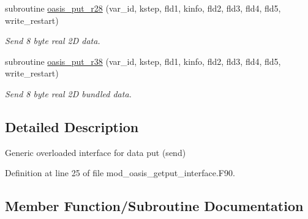 \begin{DoxyCompactItemize}
subroutine \hyperlink{interfacemod__oasis__getput__interface_1_1oasis__put_a9130f78702c3d05291301efd3eb812c6}{oasis\+\_\+put\+\_\+r28} (var\+\_\+id, kstep, fld1, kinfo, fld2, fld3, fld4, fld5, write\+\_\+restart)
\begin{DoxyCompactList}\small\item\em Send 8 byte real 2D data. \end{DoxyCompactList}\item 
subroutine \hyperlink{interfacemod__oasis__getput__interface_1_1oasis__put_a9040582c4598a3f4c6df1be95ee8913e}{oasis\+\_\+put\+\_\+r38} (var\+\_\+id, kstep, fld1, kinfo, fld2, fld3, fld4, fld5, write\+\_\+restart)
\begin{DoxyCompactList}\small\item\em Send 8 byte real 2D bundled data. \end{DoxyCompactList}\end{DoxyCompactItemize}


\subsection{Detailed Description}
Generic overloaded interface for data put (send) 

Definition at line 25 of file mod\+\_\+oasis\+\_\+getput\+\_\+interface.\+F90.



\subsection{Member Function/\+Subroutine Documentation}
\mbox{\label{interfacemod__oasis__getput__interface_1_1oasis__put_a5daa7fd6bfab2e09ba23d815d6120da1}} 
